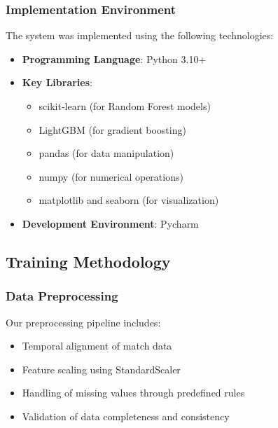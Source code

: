 \documentclass[conference]{IEEEtran}
\begin{document}
\subsubsection{Implementation Environment}
The system was implemented using the following technologies:
\begin{itemize}
\item \textbf{Programming Language}: Python 3.10+
\item \textbf{Key Libraries}:
    \begin{itemize}
    \item scikit-learn (for Random Forest models)
    \item LightGBM (for gradient boosting)
    \item pandas (for data manipulation)
    \item numpy (for numerical operations)
    \item matplotlib and seaborn (for visualization)
    \end{itemize}
\item \textbf{Development Environment}: Pycharm
\end{itemize}

\subsection{Training Methodology}
\subsubsection{Data Preprocessing}
Our preprocessing pipeline includes:
\begin{itemize}
\item Temporal alignment of match data
\item Feature scaling using StandardScaler
\item Handling of missing values through predefined rules
\item Validation of data completeness and consistency
\end{itemize}
\end{document}
